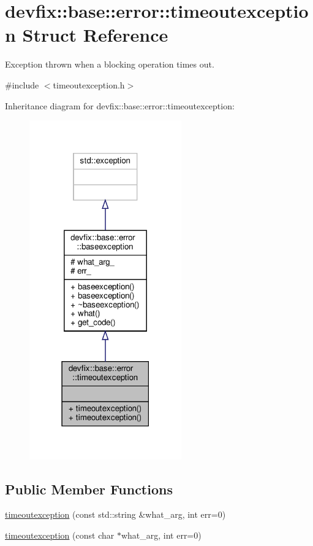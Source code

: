 \hypertarget{structdevfix_1_1base_1_1error_1_1timeoutexception}{}\section{devfix\+:\+:base\+:\+:error\+:\+:timeoutexception Struct Reference}
\label{structdevfix_1_1base_1_1error_1_1timeoutexception}


Exception thrown when a blocking operation times out.  




{\ttfamily \#include $<$timeoutexception.\+h$>$}



Inheritance diagram for devfix\+:\+:base\+:\+:error\+:\+:timeoutexception\+:\nopagebreak
\begin{figure}[H]
\begin{center}
\leavevmode
\includegraphics[width=186pt]{structdevfix_1_1base_1_1error_1_1timeoutexception__inherit__graph}
\end{center}
\end{figure}
\subsection*{Public Member Functions}
\begin{DoxyCompactItemize}
\item 
\hyperlink{structdevfix_1_1base_1_1error_1_1timeoutexception_a1795157a577b45e026b11c3b3cec80b3}{timeoutexception} (const std\+::string \&what\+\_\+arg, int err=0)
\item 
\hyperlink{structdevfix_1_1base_1_1error_1_1timeoutexception_ac35d347533a4a8ba1d19900846784e72}{timeoutexception} (const char $\ast$what\+\_\+arg, int err=0)
\end{DoxyCompactItemize}
